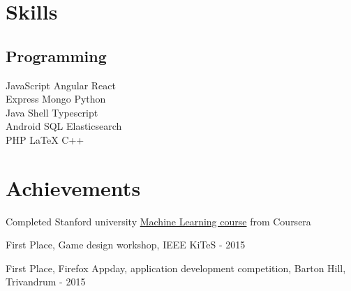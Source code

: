 \documentclass[]{font}
\begin{document}
%
%
\lastupdated

%
%

%
%

\begin{minipage}[t]{0.33\textwidth} 


\section{Skills}
\subsection{Programming}
JavaScript \textbullet{} Angular \textbullet{} React \\
Express \textbullet{}  Mongo \textbullet{} Python \\
Java \textbullet{} Shell \textbullet{} Typescript \\ 
Android \textbullet{} SQL \textbullet{} Elasticsearch \\
PHP \textbullet{} \LaTeX \textbullet{} C++\\
\sectionsep



\section{Achievements} 
\vspace{\topsep}
\begin{tightemize}
\item Completed Stanford university \href{https://www.coursera.org/account/accomplishments/records/EJQWCKEBUSBD}{Machine Learning course} from Coursera
\item First Place, Game design workshop, IEEE KiTeS - 2015
\item First Place, Firefox Appday, application development competition, Barton Hill, Trivandrum - 2015
\end{tightemize}
\sectionsep


\end{minipage}
\end{document}

